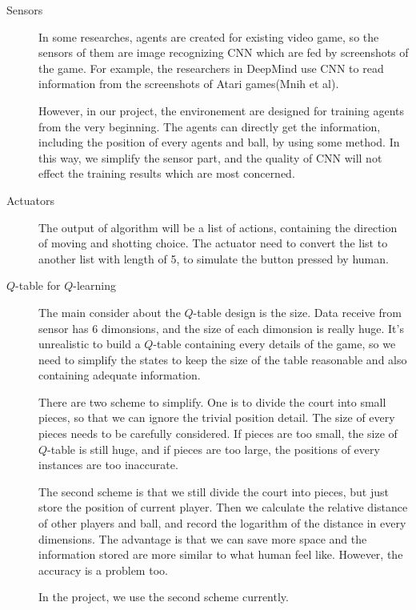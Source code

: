 \documentclass[14pt]{extarticle}
\begin{document}
\begin{description}
	\item[Sensors]
    In some researches, agents are created for existing video game, so the sensors of them are image recognizing CNN which are fed by screenshots of the game. For example, the researchers in DeepMind use CNN to read information from the screenshots of Atari games(Mnih et al).

    However, in our project, the environement are designed for training agents from the very beginning. The agents can directly get the information, including the position of every agents and ball, by using some method. In this way, we simplify the sensor part, and the quality of CNN will not effect the training results which are most concerned.
    
	\item[Actuators]
    The output of algorithm will be a list of actions, containing the direction of moving and shotting choice. The actuator need to convert the list to another list with length of 5, to simulate the button pressed by human. 

    \item[$Q$-table for $Q$-learning]
    The main consider about the $Q$-table design is the size. Data receive from sensor has 6 dimonsions, and the size of each dimonsion is really huge. It's unrealistic to build a $Q$-table containing every details of the game, so we need to simplify the states to keep the size of the table reasonable and also containing adequate information.

    There are two scheme to simplify. One is to divide the court into small pieces, so that we can ignore the trivial position detail. The size of every pieces needs to be carefully considered. If pieces are too small, the size of $Q$-table is still huge, and if pieces are too large, the positions of every instances are too inaccurate.
    
    The second scheme is that we still divide the court into pieces, but just store the position of current player. Then we calculate the relative distance of other players and ball, and record the logarithm of the distance in every dimensions. The advantage is that we can save more space and the information stored are more similar to what human feel like. However, the accuracy is a problem too.

    In the project, we use the second scheme currently.
     
    
\end{description}
\end{document}
